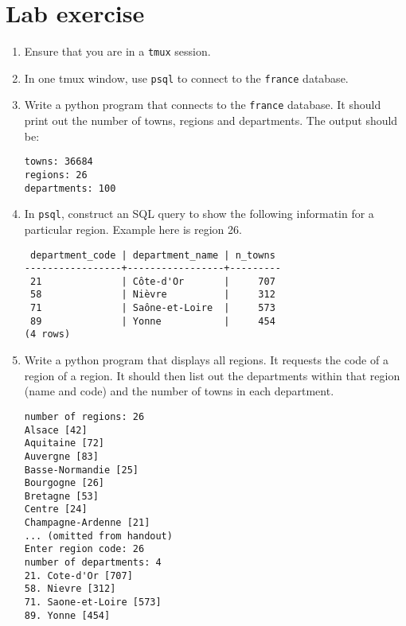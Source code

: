 \section{Lab exercise}

\begin{enumerate}

\item Ensure that you are in a \texttt{tmux} session.
  
\item In one tmux window, use \texttt{psql} to connect to the \texttt{france} database.

\item Write a python program that connects to the \texttt{france} database.
  It should print out the number of towns, regions and departments.
  The output should be: 
\begin{verbatim}
towns: 36684
regions: 26
departments: 100
\end{verbatim}

\item In \texttt{psql}, construct an SQL query to show the following informatin for a particular region.
  Example here is region 26.
\begin{verbatim}
 department_code | department_name | n_towns 
-----------------+-----------------+---------
 21              | Côte-d'Or       |     707
 58              | Nièvre          |     312
 71              | Saône-et-Loire  |     573
 89              | Yonne           |     454
(4 rows)
\end{verbatim}

\item Write a python program that displays all regions.
  It requests the code of a region of a region.
  It should then list out the departments within that region (name and code) and the number of towns in each department.
\begin{verbatim}
number of regions: 26
Alsace [42]
Aquitaine [72]
Auvergne [83]
Basse-Normandie [25]
Bourgogne [26]
Bretagne [53]
Centre [24]
Champagne-Ardenne [21]
... (omitted from handout)
Enter region code: 26
number of departments: 4
21. Cote-d'Or [707]
58. Nievre [312]
71. Saone-et-Loire [573]
89. Yonne [454]
\end{verbatim}

\end{enumerate}
  


